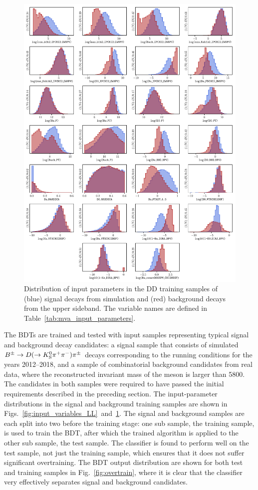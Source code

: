 \begin{figure}[p!]
    \centering
    \includegraphics[width=0.95\columnwidth]{figures/analysis/input_param_DD.pdf}
    \caption{Distribution of input parameters in the DD training samples of (blue) signal decays from simulation and (red) background decays from the upper \B sideband. The variable names are defined in Table~\ref{tab:mva_input_parameters}.}
    \label{fig:input_variables_DD}
\end{figure}


The BDTs are trained and tested with input samples representing typical signal and background decay candidates: a signal sample that consists of simulated ${{B}^\pm}\rightarrow{\ensuremath{D}}(\rightarrow{\ensuremath{{K}^0_{\mathrm{S}}}}{\ensuremath{{\pi}^+}}{\ensuremath{{\pi}^-}}){{\pi}^\pm}$ decays corresponding to the \lhcb running conditions for the years 2012--2018, and a sample of combinatorial background candidates from real data, where the reconstructed invariant mass of the \B meson is larger than 5800\mevcc. The candidates in both samples were required to have passed the initial requirements described in the preceding section. The input-parameter distributions in the signal and background training samples are shown in Figs.~\ref{fig:input_variables_LL}~and~\ref{fig:input_variables_DD}. The signal and background samples are each split into two before the training stage: one sub sample, the training sample, is used to train the BDT, after which the trained algorithm is applied to the other sub sample, the test sample. The classifier is found to perform well on the test sample, not just the training sample, which ensures that it does not suffer significant overtraining. The BDT output distribution are shown for both test and training samples in Fig.~\ref{fig:overtrain}, where it is clear that the classifier very effectively separates signal and background candidates.

